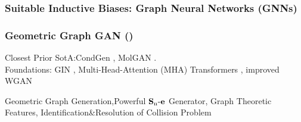 \documentclass[./presentation.tex]{subfiles}
\begin{document}
\begin{frame}[label=ggg]
  \frametitle{Suitable Inductive Biases: Graph Neural Networks (GNNs)}
    \centering
\end{frame}

\begin{frame}[t,label=ggg]
  \frametitle{Geometric Graph GAN (\cite{krawczukGGGANGeometricGraph2020})}
  \vspace{-1cm}
  \small
  \begin{priorart}
  Closest Prior SotA:CondGen \citep{yangConditionalStructureGeneration2019e}, MolGAN \citep{decaoMolGANImplicitGenerative2022b}.\\
   Foundations: GIN \citep{xuHowPowerfulAre2019e}, Multi-Head-Attention (MHA) Transformers \citep{vaswaniAttentionAllYou2017c}, improved WGAN \citep{gulrajaniImprovedTrainingWasserstein2017d}
  \end{priorart}
  \begin{contributions}
    Geometric Graph Generation,Powerful $\operatorname{\mathbf{S}_n\mathbf{-e}}$ Generator, Graph Theoretic Features, Identification\&Resolution of Collision Problem
  \end{contributions}
\end{frame}
\end{document}
